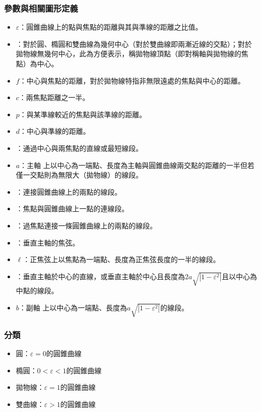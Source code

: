 \documentclass[a4paper,12pt]{article}
\begin{document}
\subsubsection{參數與相關圖形定義}
\begin{itemize}
\item {}$\varepsilon$：圓錐曲線上的點與焦點的距離與其與準線的距離之比值。
\item {}：對於圓、橢圓和雙曲線為幾何中心（對於雙曲線即兩漸近線的交點）；對於拋物線無幾何中心，此為方便表示，稱拋物線頂點（即對稱軸與拋物線的焦點）為中心。
\item {}$f$：中心與焦點的距離，對於拋物線特指非無限遠處的焦點與中心的距離。
\item {}$c$：兩焦點距離之一半。
\item {}$p$：與某準線較近的焦點與該準線的距離。
\item {}$d$：中心與準線的距離。
\item {}：通過中心與兩焦點的直線或最短線段。
\item {}$a$：主軸
上以中心為一端點、長度為主軸與圓錐曲線兩交點的距離的一半但若僅一交點則為無限大（拋物線）的線段。
\item {}：連接圓錐曲線上的兩點的線段。
\item {}：焦點與圓錐曲線上一點的連線段。
\item {}：過焦點連接一條圓錐曲線上的兩點的線段。
\item {}：垂直主軸的焦弦。
\item {}$\ell$：正焦弦上以焦點為一端點、長度為正焦弦長度的一半的線段。
\item {}：垂直主軸於中心的直線，或垂直主軸於中心且長度為$2a\sqrt{|1-\varepsilon^2|}$且以中心為中點的線段。
\item {}$b$：副軸
上以中心為一端點、長度為$a\sqrt{|1-\varepsilon^2|}$的線段。
\end{itemize}
\subsubsection{分類}
\begin{itemize}
\item 圓：$\varepsilon=0$的圓錐曲線
\item 橢圓：$0<\varepsilon<1$的圓錐曲線
\item 拋物線：$\varepsilon=1$的圓錐曲線
\item 雙曲線：$\varepsilon>1$的圓錐曲線
\end{itemize}
\end{document}
